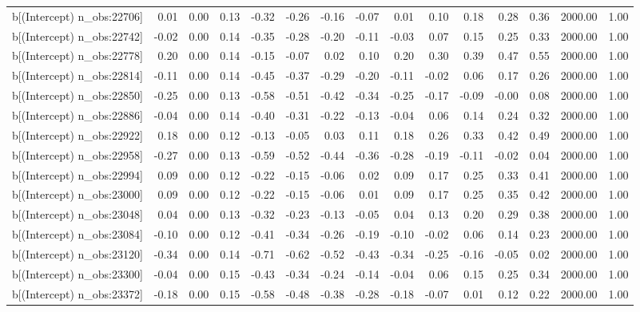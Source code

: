 \begin{table}[ht]
\begin{tabular}{rrrrrrrrrrrrrrr}
  b[(Intercept) n\_obs:22706] & 0.01 & 0.00 & 0.13 & -0.32 & -0.26 & -0.16 & -0.07 & 0.01 & 0.10 & 0.18 & 0.28 & 0.36 & 2000.00 & 1.00 \\ 
  b[(Intercept) n\_obs:22742] & -0.02 & 0.00 & 0.14 & -0.35 & -0.28 & -0.20 & -0.11 & -0.03 & 0.07 & 0.15 & 0.25 & 0.33 & 2000.00 & 1.00 \\ 
  b[(Intercept) n\_obs:22778] & 0.20 & 0.00 & 0.14 & -0.15 & -0.07 & 0.02 & 0.10 & 0.20 & 0.30 & 0.39 & 0.47 & 0.55 & 2000.00 & 1.00 \\ 
  b[(Intercept) n\_obs:22814] & -0.11 & 0.00 & 0.14 & -0.45 & -0.37 & -0.29 & -0.20 & -0.11 & -0.02 & 0.06 & 0.17 & 0.26 & 2000.00 & 1.00 \\ 
  b[(Intercept) n\_obs:22850] & -0.25 & 0.00 & 0.13 & -0.58 & -0.51 & -0.42 & -0.34 & -0.25 & -0.17 & -0.09 & -0.00 & 0.08 & 2000.00 & 1.00 \\ 
  b[(Intercept) n\_obs:22886] & -0.04 & 0.00 & 0.14 & -0.40 & -0.31 & -0.22 & -0.13 & -0.04 & 0.06 & 0.14 & 0.24 & 0.32 & 2000.00 & 1.00 \\ 
  b[(Intercept) n\_obs:22922] & 0.18 & 0.00 & 0.12 & -0.13 & -0.05 & 0.03 & 0.11 & 0.18 & 0.26 & 0.33 & 0.42 & 0.49 & 2000.00 & 1.00 \\ 
  b[(Intercept) n\_obs:22958] & -0.27 & 0.00 & 0.13 & -0.59 & -0.52 & -0.44 & -0.36 & -0.28 & -0.19 & -0.11 & -0.02 & 0.04 & 2000.00 & 1.00 \\ 
  b[(Intercept) n\_obs:22994] & 0.09 & 0.00 & 0.12 & -0.22 & -0.15 & -0.06 & 0.02 & 0.09 & 0.17 & 0.25 & 0.33 & 0.41 & 2000.00 & 1.00 \\ 
  b[(Intercept) n\_obs:23000] & 0.09 & 0.00 & 0.12 & -0.22 & -0.15 & -0.06 & 0.01 & 0.09 & 0.17 & 0.25 & 0.35 & 0.42 & 2000.00 & 1.00 \\ 
  b[(Intercept) n\_obs:23048] & 0.04 & 0.00 & 0.13 & -0.32 & -0.23 & -0.13 & -0.05 & 0.04 & 0.13 & 0.20 & 0.29 & 0.38 & 2000.00 & 1.00 \\ 
  b[(Intercept) n\_obs:23084] & -0.10 & 0.00 & 0.12 & -0.41 & -0.34 & -0.26 & -0.19 & -0.10 & -0.02 & 0.06 & 0.14 & 0.23 & 2000.00 & 1.00 \\ 
  b[(Intercept) n\_obs:23120] & -0.34 & 0.00 & 0.14 & -0.71 & -0.62 & -0.52 & -0.43 & -0.34 & -0.25 & -0.16 & -0.05 & 0.02 & 2000.00 & 1.00 \\ 
  b[(Intercept) n\_obs:23300] & -0.04 & 0.00 & 0.15 & -0.43 & -0.34 & -0.24 & -0.14 & -0.04 & 0.06 & 0.15 & 0.25 & 0.34 & 2000.00 & 1.00 \\ 
  b[(Intercept) n\_obs:23372] & -0.18 & 0.00 & 0.15 & -0.58 & -0.48 & -0.38 & -0.28 & -0.18 & -0.07 & 0.01 & 0.12 & 0.22 & 2000.00 & 1.00 \\ 

\end{tabular}
\end{table}
